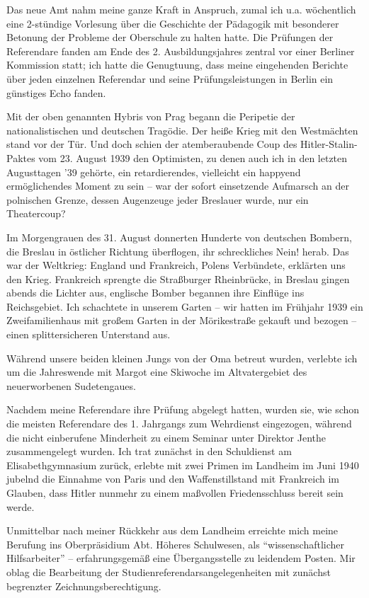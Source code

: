 Das neue Amt nahm meine ganze Kraft in Anspruch, zumal ich u.a. wöchentlich eine 2-stündige Vorlesung über die Geschichte der Pädagogik mit besonderer Betonung der Probleme der Oberschule zu halten hatte. Die Prüfungen der Referendare fanden am Ende des 2. Ausbildungsjahres zentral vor einer Berliner Kommission statt; ich hatte die Genugtuung, dass meine eingehenden Berichte über jeden einzelnen Referendar und seine Prüfungsleistungen in Berlin ein günstiges Echo fanden.

Mit der oben genannten Hybris von Prag begann die Peripetie der nationalistischen und deutschen Tragödie. Der heiße Krieg mit den Westmächten stand vor der Tür. Und doch schien der atemberaubende Coup des Hitler-Stalin-Paktes vom 23. August 1939 den Optimisten, zu denen auch ich in den letzten Augusttagen '39 gehörte, ein retardierendes, vielleicht ein happyend ermöglichendes Moment zu sein -- war der sofort einsetzende Aufmarsch an der polnischen Grenze, dessen Augenzeuge jeder Breslauer wurde, nur ein Theatercoup?

Im Morgengrauen des 31. August donnerten Hunderte von deutschen Bombern, die Breslau in östlicher Richtung überflogen, ihr schreckliches Nein! herab. Das war der Weltkrieg: England und Frankreich, Polens Verbündete, erklärten uns den Krieg. Frankreich sprengte die Straßburger Rheinbrücke, in Breslau gingen abends  die Lichter aus, englische Bomber begannen ihre Einflüge ins Reichsgebiet. Ich schachtete in unserem Garten -- wir hatten im Frühjahr 1939 ein Zweifamilienhaus mit großem Garten in der Mörikestraße gekauft und bezogen -- einen splittersicheren Unterstand aus.

Während unsere beiden kleinen Jungs von der Oma betreut wurden, verlebte ich um die Jahreswende mit Margot eine Skiwoche im Altvatergebiet des neuerworbenen Sudetengaues.

Nachdem meine Referendare ihre Prüfung abgelegt hatten, wurden sie, wie schon die meisten Referendare des 1. Jahrgangs zum Wehrdienst eingezogen, während die nicht einberufene Minderheit zu einem Seminar unter Direktor Jenthe zusammengelegt wurden. Ich trat zunächst in den Schuldienst am Elisabethgymnasium zurück, erlebte mit zwei Primen im Landheim im Juni 1940 jubelnd die Einnahme von Paris  und den Waffenstillstand mit Frankreich im Glauben, dass Hitler nunmehr zu einem maßvollen Friedensschluss bereit sein werde.

Unmittelbar nach meiner Rückkehr aus dem Landheim erreichte mich meine Berufung ins Oberpräsidium Abt. Höheres Schulwesen, als \enquote{wissenschaftlicher Hilfsarbeiter} -- erfahrungsgemäß eine Übergangsstelle zu leidendem Posten. Mir oblag die Bearbeitung der Studienreferendarsangelegenheiten mit zunächst begrenzter Zeichnungsberechtigung.

